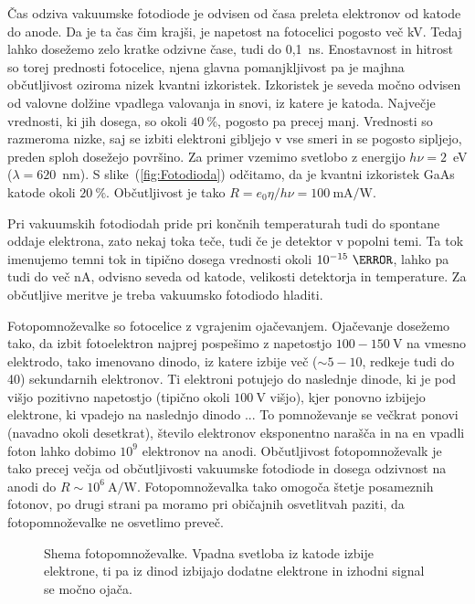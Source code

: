 Čas odziva vakuumske fotodiode je odvisen od časa preleta elektronov od katode do anode. 
Da je ta čas čim krajši, je napetost na fotocelici pogosto več kV. Tedaj lahko dosežemo 
zelo kratke odzivne čase, tudi do 0,1~ns. Enostavnost in hitrost so torej prednosti fotocelice, 
njena glavna pomanjkljivost pa je majhna občutljivost oziroma nizek kvantni izkoristek. 
Izkoristek je seveda močno odvisen od valovne dolžine vpadlega valovanja in snovi, iz 
katere je katoda. Največje vrednosti, ki jih dosega, so okoli $40~\%$, pogosto pa precej manj. 
Vrednosti so razmeroma nizke, saj se izbiti elektroni gibljejo v vse
smeri in se pogosto sipljejo, preden sploh dosežejo površino. 
Za primer vzemimo svetlobo z energijo $h\nu = 2$~eV ($\lambda=620$~nm).
S slike~(\ref{fig:Fotodioda}) odčitamo, da je kvantni izkoristek GaAs katode okoli $20~\%$. 
Občutljivost je tako $R = e_0 \eta / h\nu = 100~\si{\milli\ampere/\watt}$. 

Pri vakuumskih fotodiodah pride pri končnih temperaturah tudi do spontane oddaje elektrona, zato 
nekaj toka teče, tudi če je detektor v popolni temi. Ta tok imenujemo temni tok in tipično dosega
vrednosti okoli $10^{-15}~\ampere$, lahko pa tudi do več nA, odvisno seveda od katode, velikosti 
detektorja in temperature. Za občutljive meritve je treba vakuumsko fotodiodo hladiti. 

Fotopomnoževalke so fotocelice z vgrajenim ojačevanjem. Ojačevanje dosežemo tako, da 
izbit fotoelektron najprej pospešimo z napetostjo $100-150~\si{\volt}$ na vmesno elektrodo, 
tako imenovano dinodo, iz katere izbije več ($\sim 5 - 10$, redkeje tudi do 40) 
sekundarnih elektronov. Ti elektroni
potujejo do naslednje dinode, ki je pod višjo pozitivno napetostjo (tipično okoli $100~\si{\volt}$
višjo), kjer ponovno izbijejo elektrone, ki vpadejo na naslednjo dinodo ... 
To pomnoževanje se večkrat ponovi (navadno okoli desetkrat),
število elektronov eksponentno narašča in na en vpadli foton lahko dobimo $10^9$ elektronov na anodi. 
Občutljivost fotopomnoževalk je tako precej večja od občutljivosti vakuumske fotodiode in
dosega odzivnost na anodi do $R\sim 10^6~\si{\ampere/\watt}$.
Fotopomnoževalka tako omogoča štetje posameznih fotonov, po drugi strani pa moramo pri 
običajnih osvetlitvah paziti, da fotopomnoževalke ne osvetlimo preveč. 
\begin{figure}[h]
\centering
\def\svgwidth{80truemm} 

\caption{Shema fotopomnoževalke. Vpadna svetloba iz katode izbije elektrone, ti pa 
iz dinod izbijajo dodatne elektrone in izhodni signal se močno ojača.}
\label{fig:PMT}
\end{figure}

